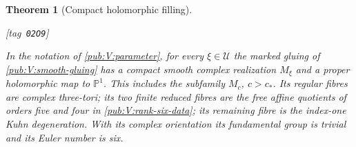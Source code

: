 \documentclass[11pt,a4paper]{article}
\numberwithin{equation}{section}
\newtheorem{theorem}{Theorem}[section]
\theoremstyle{definition}
\newcommand{\StatementRecord}[4]{{\upshape\footnotesize[tag~\texttt{#3}]}\enspace\ignorespaces}
\begin{document}
\begin{theorem}[Compact holomorphic filling]\hypertarget{tag-02O9}{}\label{maps:src:F.3.7}\hypertarget{tag-02QJ}{}\label{night:P1.10}
\StatementRecord{maps:src:F.3.7}{proved}{02O9}{\cref{night:P1.8,night:P1.9,pub:V:rank-six-data,pub:V:smooth-gluing,pub:V:cusp-smooth-dependence,rem:V:conjugation-parameter}}

In the notation of \cref{pub:V:parameter}, for every $\xi\in\mathcal U$
the marked gluing of \cref{pub:V:smooth-gluing} has a compact smooth
complex realization $M_\xi$ and a proper holomorphic map to $\mathbb P^1$.
This includes the subfamily $M_c$, $c>c_*$.
Its regular fibres are complex three-tori; its two finite reduced
fibres are the free affine quotients of orders five and four in
\cref{pub:V:rank-six-data}; its remaining fibre is the index-one
Kuhn degeneration. With its complex orientation its fundamental
group is trivial and its Euler number is six.

\end{theorem}
\end{document}
